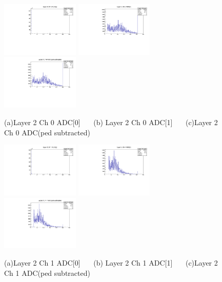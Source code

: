 \documentclass[a4paper,11pt]{article}
\theoremstyle{mytheor}
\begin{document}
\begin{figure}[H] 
\vspace*{-0.3cm} 
\includegraphics[width=0.33\textwidth,scale=0.5,trim=0 0 0 0,clip]{plotsdir/file0_test-Layer2_Ch0_adc0-1.pdf} 
\includegraphics[width=0.33\textwidth,scale=0.5,trim=0 0 0 0,clip]{plotsdir/file0_test-Layer2_Ch0_adc1-1.pdf} 
\includegraphics[width=0.33\textwidth,scale=0.5,trim=0 0 0 0,clip]{plotsdir/file0_test-Layer2_Ch0_adcPedsub-1.pdf} 
\caption{(a)Layer 2 Ch 0 ADC[0] ~~~(b) Layer 2 Ch 0 ADC[1] ~~~(c)Layer 2 Ch 0 ADC(ped subtracted) } 
\end{figure} 
\clearpage 
\begin{figure}[H] 
\vspace*{-0.3cm} 
\includegraphics[width=0.33\textwidth,scale=0.5,trim=0 0 0 0,clip]{plotsdir/file0_test-Layer2_Ch1_adc0-1.pdf} 
\includegraphics[width=0.33\textwidth,scale=0.5,trim=0 0 0 0,clip]{plotsdir/file0_test-Layer2_Ch1_adc1-1.pdf} 
\includegraphics[width=0.33\textwidth,scale=0.5,trim=0 0 0 0,clip]{plotsdir/file0_test-Layer2_Ch1_adcPedsub-1.pdf} 
\caption{(a)Layer 2 Ch 1 ADC[0] ~~~(b) Layer 2 Ch 1 ADC[1] ~~~(c)Layer 2 Ch 1 ADC(ped subtracted) } 
\end{figure} 
\end{document}

